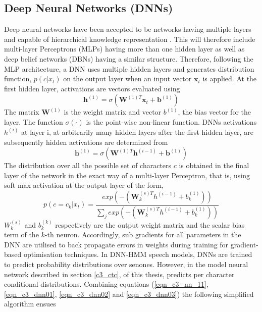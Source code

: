 \subsection{Deep Neural Networks (DNNs)}\label{dnn}

Deep neural networks have been accepted to be networks having multiple layers and capable of hierarchical knowledge representation \citep{yu2016automatic}.
 This will therefore include multi-layer Perceptrons (MLPs) having more than one hidden layer \citep{dahl2012context} as well as deep belief networks (DBNs)\citep{mohamed2009deep,yu2010roles} having a similar structure.  Therefore, following the MLP architecture, a DNN uses multiple hidden layers and generates distribution function, $p(c|x_t)$ on the output layer when an input vector $\mathbf{x}_t$ is applied.  At the first hidden layer, activations are vectors evaluated using
\begin{equation}\mathbf{h}^{(1)}=\sigma(\mathbf{W}^{(1)T}\mathbf{x}_t+\mathbf{b}^{(1)})
\label{eqn_c3_dnn01}\end{equation}
The matrix $\mathbf{W}^{(1)}$ is the weight matrix and vector $b^{(1)}$, the bias vector for the layer.  The function $\sigma(\cdot)$ is the point-wise non-linear function.
DNNs activations $h^{(i)}$ at layer i, at arbitrarily many hidden layers after the first hidden layer, are subsequently hidden activations are determined from
\begin{equation}\mathbf{h}^{(1)}=\sigma(\mathbf{W}^{(1)T}\mathbf{h}^{(i-1)}+\mathbf{b}^{(1)})
\label{eqn_c3_dnn02}\end{equation}
The distribution over all the possible set of characters $c$ is obtained in the final layer of the network in the exact way of a multi-layer Perceptron, that is, using soft max activation at the output layer of the form,
\begin{equation}p(c=c_k|x_t)=\frac{exp(-(\mathbf{W}^{(s)T}_kh^{(i-1)}+b_k^{(1)}))}{\sum_j exp(-(\mathbf{W}^{(s)T}_kh^{(i-1)}+b_k^{(1)}))}
\label{eqn_c3_dnn03}\end{equation}
$W_k^{(s)}$ and $b_k^{(k)}$ respectively are the output weight matrix and the scalar bias term of the $k$-th neuron. Accordingly, sub gradients for all parameters in the DNN are utilised to back propagate errors in weights during training for gradient-based optimisation techniques.  In DNN-HMM speech models,   DNNs are trained to predict probability distributions over senones.  However, in the model neural network described in section \ref{c3_ctc}, of this thesis, predicts per character conditional distributions.
Combining equations (\ref{eqn_c3_nn_11}, \ref{eqn_c3_dnn01}, \ref{eqn_c3_dnn02} and \ref{eqn_c3_dnn03}) the following simplified algorithm ensues

